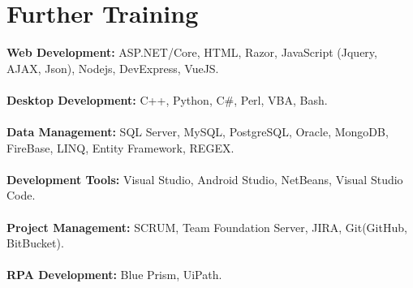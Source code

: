 \documentclass[letterpaper]{twentysecondcv} %
\begin{document}
\section{Further Training}
{
   {\textbf{Web Development:}} ASP.NET/Core, HTML, Razor, JavaScript (Jquery, AJAX, Json), Nodejs, DevExpress, VueJS.\\\\
   {\textbf{Desktop Development:}} C++, Python, C\#, Perl, VBA, Bash.\\\\
   {\textbf{Data Management:}} SQL Server, MySQL, PostgreSQL, Oracle, MongoDB, FireBase, LINQ, Entity Framework, REGEX.\\\\
   {\textbf{Development Tools:}} Visual Studio, Android Studio, NetBeans, Visual Studio Code.\\\\
   {\textbf{Project Management:}} SCRUM, Team Foundation Server, JIRA, Git(GitHub, BitBucket).\\\\
   {\textbf{RPA Development:}} Blue Prism, UiPath.\\\\
}
\end{document}
